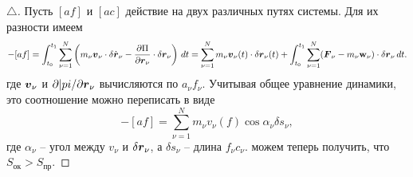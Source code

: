 \begin{proof}[$\triangle$]
    Пусть $[af]$ и $[ac]$ действие на двух различных путях системы. Для их разности имеем
    \begin{equation*}
        [ac]-[af]
        =
        \int_{t_0}^{t_1} \sum_{\nu=1}^N \left(
            m_\nu \vc{v}_\nu \cdot \delta \dot{\vc{r}}_\nu - \frac{\partial \Pi}{\partial \vc{r}_\nu} \cdot \delta \vc{r}_\nu
        \right) \d t 
        =
        \sum_{\nu=1}^N  m_\nu \vc{v}_\nu (t) \cdot \delta \vc{r}_\nu (t) 
        + 
        \int_{t_0}^{t_1} \sum_{\nu=1}^N (\vc{F}_\nu - m_\nu \vc{\mathrm{w}}_\nu) \cdot \delta \vc{r}_\nu \d t.
    \end{equation*}
    где $\mbox{\boldmath $v$}_\nu$ и $\partial |pi / \partial \mbox{\boldmath $r$}_\nu$ вычисляются по $a_\nu f_\nu$.
    Учитывая общее уравнение динамики, это соотношение можно переписать в виде
    \begin{equation*}
        [ac]-[af] = \sum_{\nu=1}^N m_\nu v_\nu(f) \cos \alpha_\nu \delta s_\nu,
    \end{equation*}
    где $\alpha_\nu$ -- угол между $v_\nu$ и $\delta \mbox{\boldmath $r$}_\nu$, а $\delta s_\nu$ -- длина $f_\nu c_\nu$.
     можем теперь получить, что $S_{\text{ок}} > S_{\text{пр}}$.
\end{proof} 



